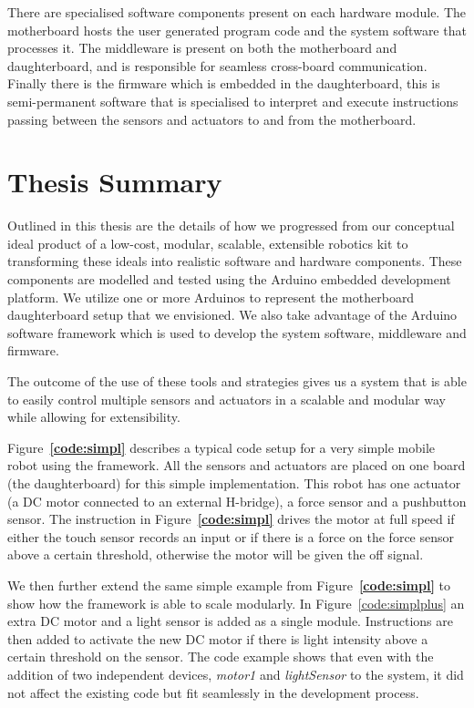 There are specialised software components present on each hardware module. The motherboard hosts the user generated program code and the system software that processes it. The middleware is present on both the motherboard and daughterboard, and is responsible for seamless cross-board communication. Finally there is the firmware which is embedded in the daughterboard, this is semi-permanent software that is specialised to interpret and execute instructions passing between the sensors and actuators to and from the motherboard.

\section{Thesis Summary}
Outlined in this thesis are the details of how we progressed from our conceptual ideal product of a low-cost, modular, scalable, extensible robotics kit to transforming these ideals into realistic software and hardware components. These components are modelled and tested using the Arduino embedded development platform. We utilize one or more Arduinos to represent the motherboard daughterboard setup that we envisioned. We also take advantage of the Arduino software framework which is used to develop the system software, middleware and firmware.

The outcome of the use of these tools and strategies gives us a system that is able to easily control multiple sensors and actuators in a scalable and modular way while allowing for extensibility.

Figure~\textbf{\ref{code:simpl}} describes a typical code setup for a very simple mobile robot using the \xten framework. All the sensors and actuators are placed on one board (the daughterboard) for this simple implementation. This robot has one actuator (a DC motor connected to an external H-bridge), a force sensor and a pushbutton sensor. The instruction in Figure~\textbf{\ref{code:simpl}} drives the motor at full speed if either the touch sensor records an input or if there is a force on the force sensor above a certain threshold, otherwise the motor will be given the off signal.

 We then further extend the same simple example from Figure~\textbf{\ref{code:simpl}} to show how the \xten framework is able to scale modularly.
 In Figure~\ref{code:simplplus} an extra DC motor and a light sensor is added as a single module. Instructions are then added to activate the new DC motor if there is light intensity above a certain threshold on the sensor. The code example shows that even with the addition of two independent devices, \emph{motor1} and \emph{lightSensor} to the system, it did not affect the existing code but fit seamlessly in the development process.
 


